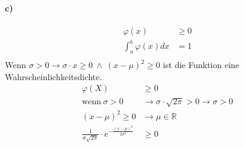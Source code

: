 \documentclass[12pt,a4paper]{report}
\begin{document}
	\paragraph{c)}
	\begin{align*}
		\varphi(x) &\geq 0 \\
		\int_a^b \varphi(x) dx &= 1 \\
	\end{align*}
	Wenn $\sigma > 0 \to \sigma \cdot x \geq 0\ \land\ (x-\mu)^2 \geq 0$ ist die Funktion eine Wahrscheinlichkeitsdichte. \\
	\begin{align*}
		\varphi(X) &\geq 0 \\
		\text{wenn}\ \sigma > 0 &\to \sigma \cdot \sqrt{2\pi} > 0 \to \sigma > 0 \\
		(x-\mu)^2 \geq 0 &\to \mu \in \mathbb{R} \\
		\frac{1}{\sigma\sqrt{2\pi}} \cdot e^{-\frac{(x-\mu)^2}{2\sigma^2}} &\geq 0
	\end{align*}
\end{document}
